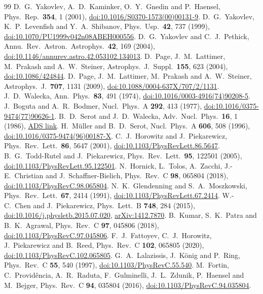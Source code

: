 \documentclass[11pt,a4paper]{article}
\newcommand{\doi}[1]{\href{https://doi.org/#1}{doi:#1}}
\newcommand{\arxiv}[1]{\href{https://arxiv.org/abs/#1}{arXiv:#1}}
\newcommand{\ads}[1]{\href{https://ui.adsabs.harvard.edu/abs/#1}{ADS link}}
\begin{document}
\begin{thebibliography}{99}
 D.~G.~Yakovlev, A.~D.~Kaminker, O.~Y.~Gnedin and P.~Haensel, Phys.\ Rep.\ \textbf{354}, 1 (2001), \doi{10.1016/S0370-1573(00)00131-9}.
 D.~G.~Yakovlev, K.~P.~Levenfish and Y.~A.~Shibanov, Phys.\ Usp.\ \textbf{42}, 737 (1999), \doi{10.1070/PU1999v042n08ABEH000556}.
 D.~G.~Yakovlev and C.~J.~Pethick, Annu.\ Rev.\ Astron.\ Astrophys.\ \textbf{42}, 169 (2004), \doi{10.1146/annurev.astro.42.053102.134013}.
 D.~Page, J.~M.~Lattimer, M.~Prakash and A.~W.~Steiner, Astrophys.\ J.\ Suppl.\ \textbf{155}, 623 (2004), \doi{10.1086/424844}.
 D.~Page, J.~M.~Lattimer, M.~Prakash and A.~W.~Steiner, Astrophys.\ J.\ \textbf{707}, 1131 (2009), \doi{10.1088/0004-637X/707/2/1131}.
 J.~D.~Walecka, Ann.\ Phys.\ \textbf{83}, 491 (1974), \doi{10.1016/0003-4916(74)90208-5}.
 J.~Boguta and A.~R.~Bodmer, Nucl.\ Phys.\ A \textbf{292}, 413 (1977), \doi{10.1016/0375-9474(77)90626-1}.
 B.~D.~Serot and J.~D.~Walecka, Adv.\ Nucl.\ Phys.\ \textbf{16}, 1 (1986), \ads{1986AdNuP..16....1S}.
 H.~M\"uller and B.~D.~Serot, Nucl.\ Phys.\ A \textbf{606}, 508 (1996), \doi{10.1016/0375-9474(96)00187-X}.
 C.~J.~Horowitz and J.~Piekarewicz, Phys.\ Rev.\ Lett.\ \textbf{86}, 5647 (2001), \doi{10.1103/PhysRevLett.86.5647}.
 B.~G.~Todd-Rutel and J.~Piekarewicz, Phys.\ Rev.\ Lett.\ \textbf{95}, 122501 (2005), \doi{10.1103/PhysRevLett.95.122501}.
 N.~Hornick, L.~Tolos, A.~Zacchi, J.-E.~Christian and J.~Schaffner-Bielich, Phys.\ Rev.\ C \textbf{98}, 065804 (2018), \doi{10.1103/PhysRevC.98.065804}.
 N.~K.~Glendenning and S.~A.~Moszkowski, Phys.\ Rev.\ Lett.\ \textbf{67}, 2414 (1991), \doi{10.1103/PhysRevLett.67.2414}.
 W.-C.~Chen and J.~Piekarewicz, Phys.\ Lett.\ B \textbf{748}, 284 (2015), \doi{10.1016/j.physletb.2015.07.020}, \arxiv{1412.7870}.
 B.~Kumar, S.~K.~Patra and B.~K.~Agrawal, Phys.\ Rev.\ C \textbf{97}, 045806 (2018), \doi{10.1103/PhysRevC.97.045806}.
 F.~J.~Fattoyev, C.~J.~Horowitz, J.~Piekarewicz and B.~Reed, Phys.\ Rev.\ C \textbf{102}, 065805 (2020), \doi{10.1103/PhysRevC.102.065805}.
 G.~A.~Lalazissis, J.~K\"onig and P.~Ring, Phys.\ Rev.\ C \textbf{55}, 540 (1997), \doi{10.1103/PhysRevC.55.540}.
 M.~Fortin, C.~Provid\^encia, A.~R.~Raduta, F.~Gulminelli, J.~L.~Zdunik, P.~Haensel and M.~Bejger, Phys.\ Rev.\ C \textbf{94}, 035804 (2016), \doi{10.1103/PhysRevC.94.035804}.

\end{thebibliography}
\end{document}

